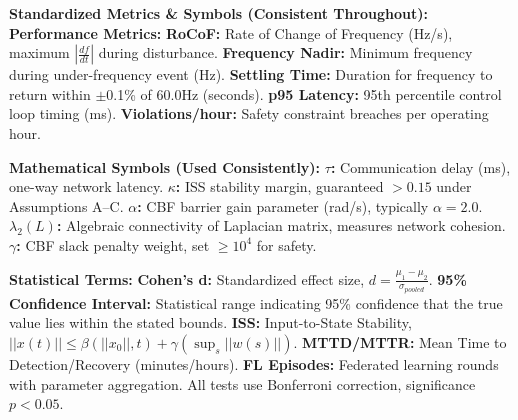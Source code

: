 \documentclass[12pt]{article}
\begin{document}
\textbf{Standardized Metrics \& Symbols (Consistent Throughout):}
\textbf{Performance Metrics:} \textbf{RoCoF:} Rate of Change of Frequency (Hz/s), maximum $|\frac{df}{dt}|$ during disturbance. \textbf{Frequency Nadir:} Minimum frequency during under-frequency event (Hz). \textbf{Settling Time:} Duration for frequency to return within $\pm$0.1\% of 60.0Hz (seconds). \textbf{p95 Latency:} 95th percentile control loop timing (ms). \textbf{Violations/hour:} Safety constraint breaches per operating hour.

\textbf{Mathematical Symbols (Used Consistently):} \textbf{$\tau$:} Communication delay (ms), one-way network latency. \textbf{$\kappa$:} ISS stability margin, guaranteed $>0.15$ under Assumptions A--C. \textbf{$\alpha$:} CBF barrier gain parameter (rad/s), typically $\alpha=2.0$. \textbf{$\lambda_2(L)$:} Algebraic connectivity of Laplacian matrix, measures network cohesion. \textbf{$\gamma$:} CBF slack penalty weight, set $\geq 10^4$ for safety.

\textbf{Statistical Terms:} \textbf{Cohen's d:} Standardized effect size, $d = \frac{\mu_1-\mu_2}{\sigma_{pooled}}$. \textbf{95\% Confidence Interval:} Statistical range indicating 95\% confidence that the true value lies within the stated bounds. \textbf{ISS:} Input-to-State Stability, $||x(t)|| \leq \beta(||x_0||,t) + \gamma(\sup_s ||w(s)||)$. \textbf{MTTD/MTTR:} Mean Time to Detection/Recovery (minutes/hours). \textbf{FL Episodes:} Federated learning rounds with parameter aggregation. All tests use Bonferroni correction, significance $p<0.05$.



\end{document}
